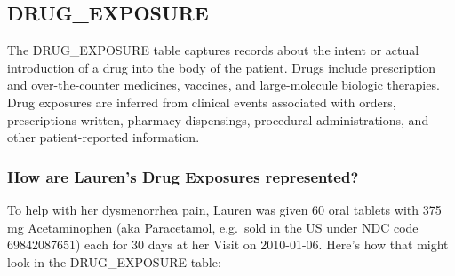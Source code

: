 \documentclass[11pt]{book}
\theoremstyle{definition}
\theoremstyle{definition}
\theoremstyle{definition}
\theoremstyle{remark}
\begin{document}
\hypertarget{drugExposure}{%
\subsection{DRUG\_EXPOSURE}\label{drugExposure}}

The DRUG\_EXPOSURE table captures records about the intent or actual introduction of a drug into the body of the patient. Drugs include prescription and over-the-counter medicines, vaccines, and large-molecule biologic therapies. Drug exposures are inferred from clinical events associated with orders, prescriptions written, pharmacy dispensings, procedural administrations, and other patient-reported information.

\hypertarget{how-are-laurens-drug-exposures-represented}{%
\subsubsection*{How are Lauren's Drug Exposures represented?}\label{how-are-laurens-drug-exposures-represented}}

To help with her dysmenorrhea pain, Lauren was given 60 oral tablets with 375 mg Acetaminophen (aka Paracetamol, e.g.~sold in the US under NDC code 69842087651) each for 30 days at her Visit on 2010-01-06. Here's how that might look in the DRUG\_EXPOSURE table:
\end{document}
